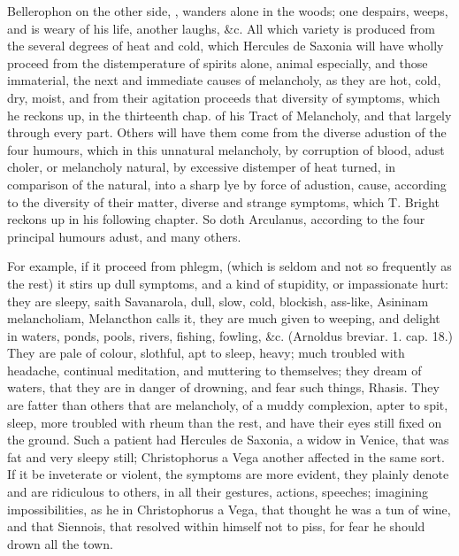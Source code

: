 {Bellerophon on the other side, , wanders
alone in the woods; one despairs, weeps, and is weary of his life,
another laughs, \&c. All which variety is produced from the several
degrees of heat and cold, which Hercules de Saxonia will have
wholly proceed from the distemperature of spirits alone, animal
especially, and those immaterial, the next and immediate causes of
melancholy, as they are hot, cold, dry, moist, and from their agitation
proceeds that diversity of symptoms, which he reckons up, in the
thirteenth chap. of his Tract of Melancholy, and that largely
through every part. Others will have them come from the diverse
adustion of the four humours, which in this unnatural melancholy, by
corruption of blood, adust choler, or melancholy natural, by
excessive distemper of heat turned, in comparison of the natural, into
a sharp lye by force of adustion, cause, according to the diversity of
their matter, diverse and strange symptoms, which T. Bright reckons up
in his following chapter. So doth Arculanus, according to the
four principal humours adust, and many others.

For example, if it proceed from phlegm, (which is seldom and not so
frequently as the rest) it stirs up dull symptoms, and a kind of
stupidity, or impassionate hurt: they are sleepy, saith
Savanarola, dull, slow, cold, blockish, ass-like, Asininam
melancholiam,  Melancthon calls it, they are much given to
weeping, and delight in waters, ponds, pools, rivers, fishing, fowling,
\&c. (Arnoldus breviar. 1. cap. 18.) They are pale of colour,
slothful, apt to sleep, heavy; much troubled with headache,
continual meditation, and muttering to themselves; they dream of
waters, that they are in danger of drowning, and fear such
things, Rhasis. They are fatter than others that are melancholy, of a
muddy complexion, apter to spit,  sleep, more troubled with rheum
than the rest, and have their eyes still fixed on the ground. Such a
patient had Hercules de Saxonia, a widow in Venice, that was fat and
very sleepy still; Christophorus a Vega another affected in the same
sort. If it be inveterate or violent, the symptoms are more evident,
they plainly denote and are ridiculous to others, in all their
gestures, actions, speeches; imagining impossibilities, as he in
Christophorus a Vega, that thought he was a tun of wine, and that
Siennois, that resolved within himself not to piss, for fear he should
drown all the town.

}
